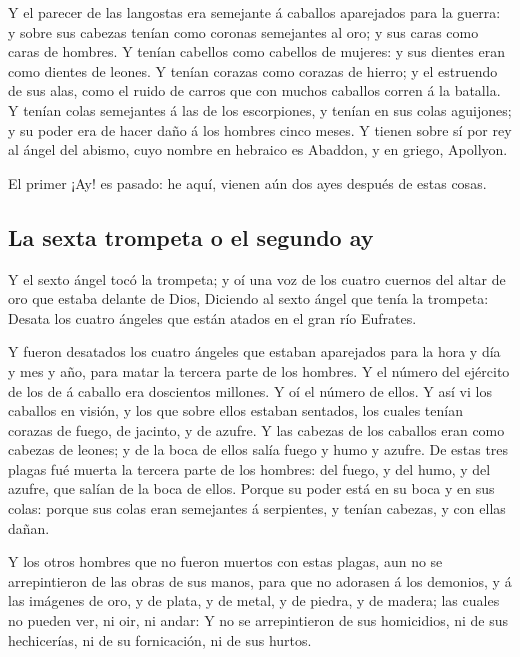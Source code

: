 Y el parecer de las langostas era semejante á caballos
aparejados para la guerra: y sobre sus cabezas tenían como coronas
semejantes al oro; y sus caras como caras de hombres.  Y
tenían cabellos como cabellos de mujeres: y sus dientes eran como
dientes de leones.  Y tenían corazas como corazas de hierro;
y el estruendo de sus alas, como el ruido de carros que con muchos
caballos corren á la batalla.  Y tenían colas semejantes á
las de los escorpiones, y tenían en sus colas aguijones; y su poder era
de hacer daño á los hombres cinco meses.  Y tienen sobre sí
por rey al ángel del abismo, cuyo nombre en hebraico es Abaddon, y en
griego, Apollyon.

 El primer ¡Ay! es pasado: he aquí, vienen aún dos ayes
después de estas cosas.

\hypertarget{la-sexta-trompeta-o-el-segundo-ay}{%
\subsection{La sexta trompeta o el segundo
ay}\label{la-sexta-trompeta-o-el-segundo-ay}}

 Y el sexto ángel tocó la trompeta; y oí una voz de los
cuatro cuernos del altar de oro que estaba delante de Dios,
 Diciendo al sexto ángel que tenía la trompeta: Desata los
cuatro ángeles que están atados en el gran río Eufrates.

 Y fueron desatados los cuatro ángeles que estaban
aparejados para la hora y día y mes y año, para matar la tercera parte
de los hombres.  Y el número del ejército de los de á
caballo era doscientos millones. Y oí el número de ellos. 
Y así vi los caballos en visión, y los que sobre ellos estaban sentados,
los cuales tenían corazas de fuego, de jacinto, y de azufre. Y las
cabezas de los caballos eran como cabezas de leones; y de la boca de
ellos salía fuego y humo y azufre.  De estas tres plagas
fué muerta la tercera parte de los hombres: del fuego, y del humo, y del
azufre, que salían de la boca de ellos.  Porque su poder
está en su boca y en sus colas: porque sus colas eran semejantes á
serpientes, y tenían cabezas, y con ellas dañan.

 Y los otros hombres que no fueron muertos con estas
plagas, aun no se arrepintieron de las obras de sus manos, para que no
adorasen á los demonios, y á las imágenes de oro, y de plata, y de
metal, y de piedra, y de madera; las cuales no pueden ver, ni oir, ni
andar:  Y no se arrepintieron de sus homicidios, ni de sus
hechicerías, ni de su fornicación, ni de sus hurtos.

